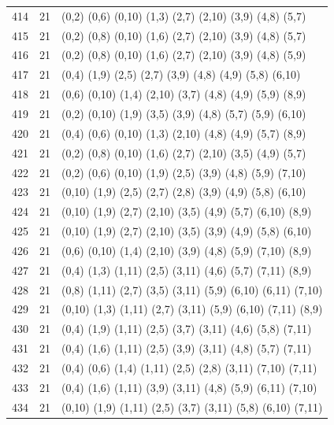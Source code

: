 \begin{appendix}
{\begin{longtable}{lll}
    414& 21 & (0,2)   (0,6)   (0,10)  (1,3)   (2,7)   (2,10)  (3,9)   (4,8)   (5,7)\\
    415& 21 & (0,2)   (0,8)   (0,10)  (1,6)   (2,7)   (2,10)  (3,9)   (4,8)   (5,7)\\
    416& 21 & (0,2)   (0,8)   (0,10)  (1,6)   (2,7)   (2,10)  (3,9)   (4,8)   (5,9)\\
    417& 21 & (0,4)   (1,9)   (2,5)   (2,7)   (3,9)   (4,8)   (4,9)   (5,8)   (6,10)\\
    418& 21 & (0,6)   (0,10)  (1,4)   (2,10)  (3,7)   (4,8)   (4,9)   (5,9)   (8,9)\\
    419& 21 & (0,2)   (0,10)  (1,9)   (3,5)   (3,9)   (4,8)   (5,7)   (5,9)   (6,10)\\
    420& 21 & (0,4)   (0,6)   (0,10)  (1,3)   (2,10)  (4,8)   (4,9)   (5,7)   (8,9)\\
    421& 21 & (0,2)   (0,8)   (0,10)  (1,6)   (2,7)   (2,10)  (3,5)   (4,9)   (5,7)\\
    422& 21 & (0,2)   (0,6)   (0,10)  (1,9)   (2,5)   (3,9)   (4,8)   (5,9)   (7,10)\\
    423& 21 & (0,10)  (1,9)   (2,5)   (2,7)   (2,8)   (3,9)   (4,9)   (5,8)   (6,10)\\
    424& 21 & (0,10)  (1,9)   (2,7)   (2,10)  (3,5)   (4,9)   (5,7)   (6,10)  (8,9)\\
    425& 21 & (0,10)  (1,9)   (2,7)   (2,10)  (3,5)   (3,9)   (4,9)   (5,8)   (6,10)\\
    426& 21 & (0,6)   (0,10)  (1,4)   (2,10)  (3,9)   (4,8)   (5,9)   (7,10)  (8,9)\\
    427& 21 & (0,4)   (1,3)   (1,11)  (2,5)   (3,11)  (4,6)   (5,7)   (7,11)  (8,9)\\
    428& 21 & (0,8)   (1,11)  (2,7)   (3,5)   (3,11)  (5,9)   (6,10)  (6,11)  (7,10)\\
    429& 21 & (0,10)  (1,3)   (1,11)  (2,7)   (3,11)  (5,9)   (6,10)  (7,11)  (8,9)\\
    430& 21 & (0,4)   (1,9)   (1,11)  (2,5)   (3,7)   (3,11)  (4,6)   (5,8)   (7,11)\\
    431& 21 & (0,4)   (1,6)   (1,11)  (2,5)   (3,9)   (3,11)  (4,8)   (5,7)   (7,11)\\
    432& 21 & (0,4)   (0,6)   (1,4)   (1,11)  (2,5)   (2,8)   (3,11)  (7,10)  (7,11)\\
    433& 21 & (0,4)   (1,6)   (1,11)  (3,9)   (3,11)  (4,8)   (5,9)   (6,11)  (7,10)\\
    434& 21 & (0,10)  (1,9)   (1,11)  (2,5)   (3,7)   (3,11)  (5,8)   (6,10)  (7,11)\\

\end{longtable}}
\end{appendix}
